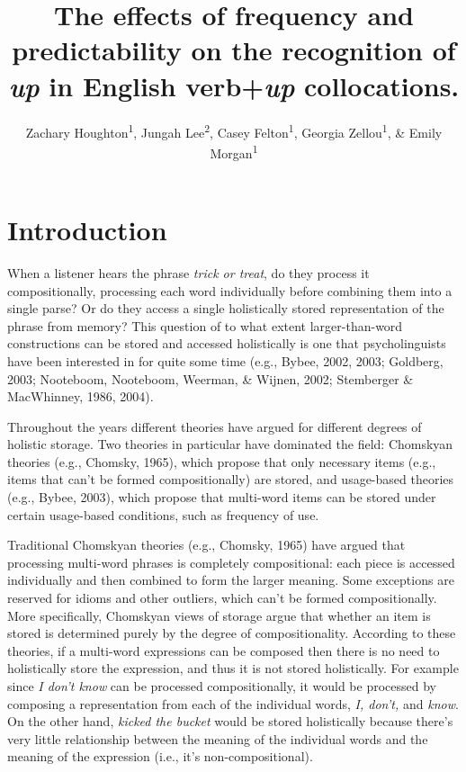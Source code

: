 \documentclass[
  man,floatsintext]{apa6}
\title{The effects of frequency and predictability on the recognition of \emph{up} in English verb+\emph{up} collocations.}
\author{Zachary Houghton\textsuperscript{1}, Jungah Lee\textsuperscript{2}, Casey Felton\textsuperscript{1}, Georgia Zellou\textsuperscript{1}, \& Emily Morgan\textsuperscript{1}}
\date{}
\affiliation{\vspace{0.5cm}\textsuperscript{1} University of California, Davis\\\textsuperscript{2} Chosun University}
\begin{document}
\maketitle

\section{Introduction}\label{introduction}

When a listener hears the phrase \emph{trick or treat}, do they process it compositionally, processing each word individually before combining them into a single parse? Or do they access a single holistically stored representation of the phrase from memory? This question of to what extent larger-than-word constructions can be stored and accessed holistically is one that psycholinguists have been interested in for quite some time (e.g., Bybee, 2002, 2003; Goldberg, 2003; Nooteboom, Nooteboom, Weerman, \& Wijnen, 2002; Stemberger \& MacWhinney, 1986, 2004).

Throughout the years different theories have argued for different degrees of holistic storage. Two theories in particular have dominated the field: Chomskyan theories (e.g., Chomsky, 1965), which propose that only necessary items (e.g., items that can't be formed compositionally) are stored, and usage-based theories (e.g., Bybee, 2003), which propose that multi-word items can be stored under certain usage-based conditions, such as frequency of use.

Traditional Chomskyan theories (e.g., Chomsky, 1965) have argued that processing multi-word phrases is completely compositional: each piece is accessed individually and then combined to form the larger meaning. Some exceptions are reserved for idioms and other outliers, which can't be formed compositionally. More specifically, Chomskyan views of storage argue that whether an item is stored is determined purely by the degree of compositionality. According to these theories, if a multi-word expressions can be composed then there is no need to holistically store the expression, and thus it is not stored holistically. For example since \emph{I don't know} can be processed compositionally, it would be processed by composing a representation from each of the individual words, \emph{I, don't,} and \emph{know}. On the other hand, \emph{kicked the bucket} would be stored holistically because there's very little relationship between the meaning of the individual words and the meaning of the expression (i.e., it's non-compositional).
\end{document}
